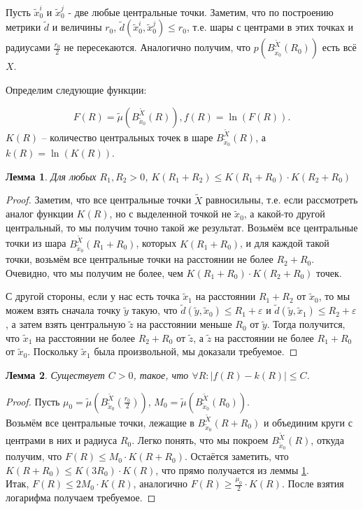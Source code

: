\documentclass[11pt]{article}
\theoremstyle{definition}
\theoremstyle{plain}
\theoremstyle{plain}
\newtheorem{lemma}{Лемма}
\def\leq{\leqslant}
\def\geq{\geqslant}
\def\wt#1{\widetilde{#1}}
\def\wtB#1{B_{\wt{x}_0}^{\wt{X}}(#1)}
\begin{document}
Пусть $\wt{x}_0^i$ и $\wt{x}_0^j$ - две любые центральные точки.
Заметим, что по построению метрики $\wt{d}$ и величины $r_0$, $\wt{d}(\wt{x}_0^i, \wt{x}_0^j) \leq r_0$, т.е. шары
с центрами в этих точках и радиусами $\frac{r_0}{2}$ не пересекаются.
Аналогично получим, что $p \left(B_{\wt{x}_0}^{\wt{X}} (R_0) \right)$ есть всё $X$.



Определим следующие функции:

$$
F(R)=\wt{\mu}\left(B_{\wt{x}_0}^{\wt{X}}(R)\right),
f(R)=\ln(F(R)).
$$
$K(R)$ -- количество центральных точек в шаре $B_{\wt{x}_0}^{\wt{X}} (R)$, а $k(R) = \ln(K(R))$.

\begin{lemma}\label{l_K_1}
Для любых $R_1, R_2 > 0$, $K(R_1 + R_2) \leq K(R_1+R_0) \cdot K(R_2+R_0)$
\end{lemma}

\begin{proof}
Заметим, что все центральные точки $\wt{X}$ равносильны, т.е. если рассмотреть аналог функции $K(R)$, но с выделенной точкой не $\wt{x}_0$, 
а какой-то другой центральный, то мы получим точно такой же результат. Возьмём все центральные точки из шара $\wtB{R_1 + R_0}$, которых $K(R_1 + R_0)$,
и для каждой такой точки, возьмём все центральные точки на расстоянии не более $R_2 + R_0$. 
Очевидно, что мы получим не более, чем $K(R_1+R_0) \cdot K(R_2+R_0)$ точек. 

С другой стороны, если у нас есть точка $\wt{x}_1$ на расстоянии $R_1 + R_2$ от $\wt{x}_0$, то мы можем взять сначала точку 
$\wt{y}$ такую, что $\wt{d}(\wt{y}, \wt{x}_0) \leq R_1 + \varepsilon$ и $\wt{d}(\wt{y}, \wt{x}_1) \leq R_2 + \varepsilon$,
а затем взять центральную $\wt{z}$ на расстоянии меньше $R_0$ от $\wt{y}$. 
Тогда получится, что $\wt{x}_1$ на расстоянии не более $R_2 + R_0$ от $\wt{z}$, а $\wt{z}$ на расстоянии не более $R_1 + R_0$ от $\wt{x}_0$.
Поскольку $\wt{x}_1$ была произвольной, мы доказали требуемое.
\end{proof}

\begin{lemma}
Существует $C > 0$, такое, что $\forall R : |f(R) - k(R)| \leq C$.
\end{lemma}

\begin{proof}
Пусть $\mu_0 =  \wt{\mu}\left( B_{\wt{x}_0}^{\wt{X}}(\frac{r_0}{2}) \right)$, 
$M_0 =  \wt{\mu}\left( B_{\wt{x}_0}^{\wt{X}}(R_0) \right)$.\\
Возьмём все центральные точки, лежащие в $B_{\wt{x}_0}^{\wt{X}}(R + R_0)$ 
и объединим круги с центрами в них и радиуса $R_0$. Легко понять, что мы покроем $B_{\wt{x}_0}^{\wt{X}}(R)$, откуда получим, 
что $F(R) \leq M_0\cdot K(R + R_0)$. Остаётся заметить, что $K(R + R_0) \leq K(3 R_0) \cdot K(R)$, что прямо получается из леммы \ref{l_K_1}. \\
Итак, $F(R) \leq 2 M_0\cdot K(R)$, аналогично $F(R) \geq \frac{\mu_0}{2}\cdot K(R)$. 
После взятия логарифма получаем требуемое.
\end{proof}
\end{document}
